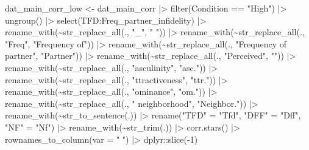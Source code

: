 \documentclass[
  bookmarksnumbered]{article}
\newenvironment{Shaded}{\begin{snugshade}}{\end{snugshade}}
\newcommand{\AttributeTok}[1]{\textcolor[rgb]{0.80,0.80,0.80}{#1}}
\newcommand{\DecValTok}[1]{\textcolor[rgb]{0.86,0.86,0.80}{#1}}
\newcommand{\FunctionTok}[1]{\textcolor[rgb]{0.94,0.94,0.56}{#1}}
\newcommand{\NormalTok}[1]{\textcolor[rgb]{0.80,0.80,0.80}{#1}}
\newcommand{\OtherTok}[1]{\textcolor[rgb]{0.94,0.94,0.56}{#1}}
\newcommand{\SpecialCharTok}[1]{\textcolor[rgb]{0.86,0.64,0.64}{#1}}
\newcommand{\StringTok}[1]{\textcolor[rgb]{0.80,0.58,0.58}{#1}}
\begin{document}
\begin{Shaded}
\begin{Highlighting}[]
\NormalTok{dat\_main\_corr\_low }\OtherTok{\textless{}{-}}\NormalTok{ dat\_main\_corr }\SpecialCharTok{|\textgreater{}} 
  \FunctionTok{filter}\NormalTok{(Condition }\SpecialCharTok{==} \StringTok{"High"}\NormalTok{) }\SpecialCharTok{|\textgreater{}} 
  \FunctionTok{ungroup}\NormalTok{() }\SpecialCharTok{|\textgreater{}} 
  \FunctionTok{select}\NormalTok{(TFD}\SpecialCharTok{:}\NormalTok{Freq\_partner\_infidelity) }\SpecialCharTok{|\textgreater{}} 
  \FunctionTok{rename\_with}\NormalTok{(}\SpecialCharTok{\textasciitilde{}}\FunctionTok{str\_replace\_all}\NormalTok{(., }\StringTok{"\_"}\NormalTok{, }\StringTok{" "}\NormalTok{)) }\SpecialCharTok{|\textgreater{}} 
  \FunctionTok{rename\_with}\NormalTok{(}\SpecialCharTok{\textasciitilde{}}\FunctionTok{str\_replace\_all}\NormalTok{(., }\StringTok{"Freq"}\NormalTok{, }\StringTok{"Frequency of"}\NormalTok{)) }\SpecialCharTok{|\textgreater{}}
  \FunctionTok{rename\_with}\NormalTok{(}\SpecialCharTok{\textasciitilde{}}\FunctionTok{str\_replace\_all}\NormalTok{(., }\StringTok{"Frequency of partner"}\NormalTok{, }\StringTok{"Partner"}\NormalTok{)) }\SpecialCharTok{|\textgreater{}}
  \FunctionTok{rename\_with}\NormalTok{(}\SpecialCharTok{\textasciitilde{}}\FunctionTok{str\_replace\_all}\NormalTok{(., }\StringTok{"Perceived"}\NormalTok{, }\StringTok{""}\NormalTok{)) }\SpecialCharTok{|\textgreater{}}
  \FunctionTok{rename\_with}\NormalTok{(}\SpecialCharTok{\textasciitilde{}}\FunctionTok{str\_replace\_all}\NormalTok{(., }\StringTok{"asculinity"}\NormalTok{, }\StringTok{"asc."}\NormalTok{)) }\SpecialCharTok{|\textgreater{}}
  \FunctionTok{rename\_with}\NormalTok{(}\SpecialCharTok{\textasciitilde{}}\FunctionTok{str\_replace\_all}\NormalTok{(., }\StringTok{"ttractiveness"}\NormalTok{, }\StringTok{"ttr."}\NormalTok{)) }\SpecialCharTok{|\textgreater{}}
  \FunctionTok{rename\_with}\NormalTok{(}\SpecialCharTok{\textasciitilde{}}\FunctionTok{str\_replace\_all}\NormalTok{(., }\StringTok{"ominance"}\NormalTok{, }\StringTok{"om."}\NormalTok{)) }\SpecialCharTok{|\textgreater{}}
  \FunctionTok{rename\_with}\NormalTok{(}\SpecialCharTok{\textasciitilde{}}\FunctionTok{str\_replace\_all}\NormalTok{(., }\StringTok{" neighborhood"}\NormalTok{, }\StringTok{"Neighbor."}\NormalTok{)) }\SpecialCharTok{|\textgreater{}}
  \FunctionTok{rename\_with}\NormalTok{(}\SpecialCharTok{\textasciitilde{}}\FunctionTok{str\_to\_sentence}\NormalTok{(.)) }\SpecialCharTok{|\textgreater{}}
    \FunctionTok{rename}\NormalTok{(}\StringTok{"TFD"} \OtherTok{=} \StringTok{"Tfd"}\NormalTok{, }
         \StringTok{"DFF"} \OtherTok{=} \StringTok{"Dff"}\NormalTok{, }
         \StringTok{"NF"} \OtherTok{=} \StringTok{"Nf"}\NormalTok{) }\SpecialCharTok{|\textgreater{}} 
  \FunctionTok{rename\_with}\NormalTok{(}\SpecialCharTok{\textasciitilde{}}\FunctionTok{str\_trim}\NormalTok{(.)) }\SpecialCharTok{|\textgreater{}}
  \FunctionTok{corr.stars}\NormalTok{() }\SpecialCharTok{|\textgreater{}}
  \FunctionTok{rownames\_to\_column}\NormalTok{(}\AttributeTok{var =} \StringTok{" "}\NormalTok{) }\SpecialCharTok{|\textgreater{}} 
\NormalTok{  dplyr}\SpecialCharTok{::}\FunctionTok{slice}\NormalTok{(}\SpecialCharTok{{-}}\DecValTok{1}\NormalTok{)  }
  

\end{Highlighting}
\end{Shaded}
\end{document}
